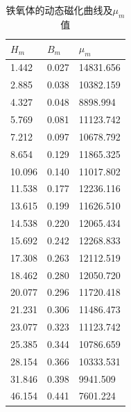 \documentclass[zihao=5, UTF8]{article}
\theoremstyle{MyLineTheoremStyle} %
\theoremstyle{MyBlockTheoremStyle} %
\theoremstyle{MySubsubsectionStyle} %
\begin{document}
\begin{table}[H]
  \centering
  \caption{铁氧体的动态磁化曲线及$\mu_m$值}\label{铁氧体的动态磁化曲线}
                \begin{tabularx}{\textwidth}{|X|X|X|}
                \hline
                $H_m$ & $B_m$ & $\mu_m$ \\
                \hline
                1.442 & 0.027 & 14831.656 \\
                \hline
                2.885 & 0.038 & 10382.159 \\
                \hline
                4.327 & 0.048 & 8898.994 \\
                \hline
                5.769 & 0.081 & 11123.742 \\
                \hline
                7.212 & 0.097 & 10678.792 \\
                \hline
                8.654 & 0.129 & 11865.325 \\
                \hline
                10.096 & 0.140 & 11017.802 \\
                \hline
                11.538 & 0.177 & 12236.116 \\
                \hline
                13.615 & 0.199 & 11626.510 \\
                \hline
                14.538 & 0.220 & 12065.434 \\
                \hline
                15.692 & 0.242 & 12268.833 \\
                \hline
                17.308 & 0.263 & 12112.519 \\
                \hline
                18.462 & 0.280 & 12050.720 \\
                \hline
                20.077 & 0.296 & 11720.418 \\
                \hline
                21.231 & 0.306 & 11486.473 \\
                \hline
                23.077 & 0.323 & 11123.742 \\
                \hline
                25.385 & 0.344 & 10786.659 \\
                \hline
                28.154 & 0.366 & 10333.531 \\
                \hline
                31.846 & 0.398 & 9941.509 \\
                \hline
                46.154 & 0.441 & 7601.224 \\
                \hline
                \end{tabularx}
\end{table}
\end{document}
